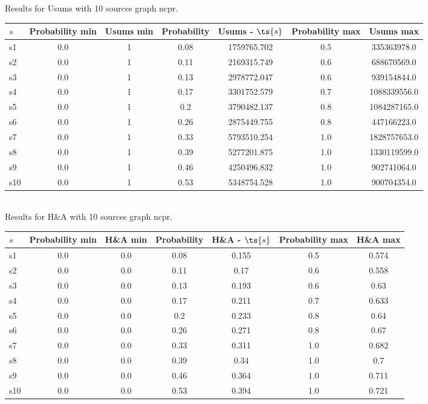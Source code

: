 \documentclass{article}
\begin{document}
\noindent Results for Usums with 10 sources graph ncpr.

\noindent\begin{tabular}{|l|c|c|c|c|c|c|}
\hline
$s$& Probability min & Usums min & Probability & Usums - $\ts{s}$ & Probability max & Usums max\\
\hline
s1 &0.0 & 1 & 0.08 & 1759765.702 & 0.5 & 335363978.0\\
\hline
s2 &0.0 & 1 & 0.11 & 2169315.749 & 0.6 & 688670569.0\\
\hline
s3 &0.0 & 1 & 0.13 & 2978772.047 & 0.6 & 939154844.0\\
\hline
s4 &0.0 & 1 & 0.17 & 3301752.579 & 0.7 & 1088339556.0\\
\hline
s5 &0.0 & 1 & 0.2 & 3790482.137 & 0.8 & 1084287165.0\\
\hline
s6 &0.0 & 1 & 0.26 & 2875449.755 & 0.8 & 447166223.0\\
\hline
s7 &0.0 & 1 & 0.33 & 5793510.254 & 1.0 & 1828757653.0\\
\hline
s8 &0.0 & 1 & 0.39 & 5277201.875 & 1.0 & 1330119599.0\\
\hline
s9 &0.0 & 1 & 0.46 & 4250496.832 & 1.0 & 902741064.0\\
\hline
s10 &0.0 & 1 & 0.53 & 5348754.528 & 1.0 & 900704354.0\\
\hline
\end{tabular}\\

\noindent Results for H\&A with 10 sources graph ncpr.

\noindent\begin{tabular}{|l|c|c|c|c|c|c|}
\hline
$s$& Probability min & H\&A min & Probability & H\&A - $\ts{s}$ & Probability max & H\&A max\\
\hline
s1 &0.0 & 0.0 & 0.08 & 0.155 & 0.5 & 0.574\\
\hline
s2 &0.0 & 0.0 & 0.11 & 0.17 & 0.6 & 0.558\\
\hline
s3 &0.0 & 0.0 & 0.13 & 0.193 & 0.6 & 0.63\\
\hline
s4 &0.0 & 0.0 & 0.17 & 0.211 & 0.7 & 0.633\\
\hline
s5 &0.0 & 0.0 & 0.2 & 0.233 & 0.8 & 0.64\\
\hline
s6 &0.0 & 0.0 & 0.26 & 0.271 & 0.8 & 0.67\\
\hline
s7 &0.0 & 0.0 & 0.33 & 0.311 & 1.0 & 0.682\\
\hline
s8 &0.0 & 0.0 & 0.39 & 0.34 & 1.0 & 0.7\\
\hline
s9 &0.0 & 0.0 & 0.46 & 0.364 & 1.0 & 0.711\\
\hline
s10 &0.0 & 0.0 & 0.53 & 0.394 & 1.0 & 0.721\\
\hline
\end{tabular}\\
\end{document}
